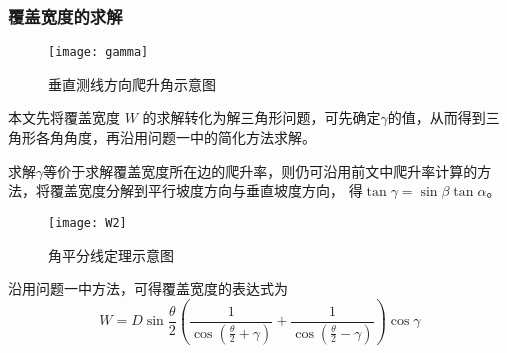 \documentclass[withoutpreface,bwprint]{cumcmthesis} %
\begin{document}
        \subsubsection{覆盖宽度的求解}
        \begin{figure}[H]
            \centering
            \texttt{[image: gamma]}
            \caption{垂直测线方向爬升角示意图}
            \label{fig:gamma1}
        \end{figure}
        本文先将覆盖宽度 $W$ 的求解转化为解三角形问题，可先确定$\gamma$的值，从而得到三角形各角角度，再沿用问题一中的简化方法求解。

        求解$\gamma$等价于求解覆盖宽度所在边的爬升率，则仍可沿用前文中爬升率计算的方法，将覆盖宽度分解到平行坡度方向与垂直坡度方向，
        得$\tan\gamma = \sin\beta \tan\alpha $。
        \begin{figure}[H]
            \centering
            \texttt{[image: W2]}
            \caption{角平分线定理示意图}
            \label{fig:W2}
        \end{figure}
        沿用问题一中方法，可得覆盖宽度的表达式为
        \begin{equation}
            W = D\sin\frac{\theta}{2}(\frac{1}{\cos(\frac{\theta}{2}+\gamma)} + \frac{1}{\cos(\frac{\theta}{2} - \gamma)})\cos\gamma
            \label{eq:over_width_2}
        \end{equation}
        
\end{document}
